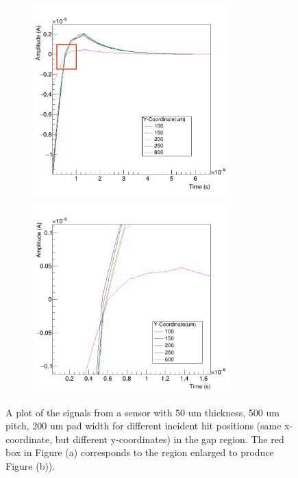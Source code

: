 \documentclass[11pt]{article}
\begin{document}
\begin{figure}[h!]
    \centering
    \begin{subfigure}[t]{0.49\textwidth}
        \centering
        \includegraphics[width=3in]{Images/time_delay_plot_200W_full.png}
        \caption{}
        \label{fig:time_delay_plot_full}
    \end{subfigure}%
    \begin{subfigure}[t]{0.49\textwidth}
        \centering
        \includegraphics[width=3in]{Images/time_delay_plot_200W_sig.png}
        \caption{}
        \label{fig:time_delay_plot_sig}
    \end{subfigure}
    \caption{A plot of the signals from a sensor with 50 um thickness, 500 um pitch, 200 um pad width for different incident hit positions (same x-coordinate, but different y-coordinates) in the gap region. The red box in Figure (a) corresponds to the region enlarged to produce Figure (b)).}
\end{figure}
\end{document}
